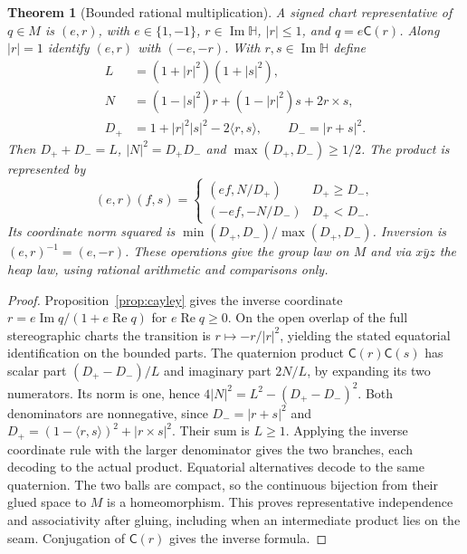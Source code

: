 \documentclass[11pt,reqno]{amsart}
\newtheorem{theorem}{Theorem}[section]
\theoremstyle{definition}
\theoremstyle{remark}
\numberwithin{equation}{section}
\newcommand{\HH}{\mathbb{H}}
\newcommand{\re}{\operatorname{Re}}
\newcommand{\im}{\operatorname{Im}}
\newcommand{\ip}[2]{\langle #1,#2\rangle}
\newcommand{\Cay}{\mathsf{C}}
\begin{document}
\begin{theorem}[Bounded rational multiplication]\label{m4:atlas}
A signed chart representative of $q\in M$ is $(e,r)$, with $e\in\{1,-1\}$, $r\in\im\HH$, $|r|\le1$, and $q=e\Cay(r)$. Along $|r|=1$ identify $(e,r)$ with $(-e,-r)$. With $r,s\in\im\HH$ define
\begin{align*}
 L&=(1+|r|^2)(1+|s|^2),\\
 N&=(1-|s|^2)r+(1-|r|^2)s+2r\times s,\\
 D_+&=1+|r|^2|s|^2-2\ip rs,\qquad D_-=|r+s|^2 .
\end{align*}
Then $D_++D_-=L$, $|N|^2=D_+D_-$ and $\max(D_+,D_-)\ge1/2$. The product is represented by
\[
 (e,r)(f,s)=
 \begin{cases}
 (ef,N/D_+) & D_+\ge D_-,\\
 (-ef,-N/D_-) & D_+<D_-.
 \end{cases}
\]
Its coordinate norm squared is $\min(D_+,D_-)/\max(D_+,D_-)$. Inversion is $(e,r)^{-1}=(e,-r)$. These operations give the group law on $M$ and via $x\bar yz$ the heap law, using rational arithmetic and comparisons only.
\end{theorem}
\begin{proof}
Proposition~\ref{prop:cayley} gives the inverse coordinate $r=e\im q/(1+e\re q)$ for $e\re q\ge0$. On the open overlap of the full stereographic charts the transition is $r\mapsto-r/|r|^2$, yielding the stated equatorial identification on the bounded parts. The quaternion product $\Cay(r)\Cay(s)$ has scalar part $(D_+-D_-)/L$ and imaginary part $2N/L$, by expanding its two numerators. Its norm is one, hence $4|N|^2=L^2-(D_+-D_-)^2$. Both denominators are nonnegative, since $D_- = |r+s|^2$ and $D_+=(1-\ip rs)^2+|r\times s|^2$. Their sum is $L\ge1$. Applying the inverse coordinate rule with the larger denominator gives the two branches, each decoding to the actual product. Equatorial alternatives decode to the same quaternion. The two balls are compact, so the continuous bijection from their glued space to $M$ is a homeomorphism. This proves representative independence and associativity after gluing, including when an intermediate product lies on the seam. Conjugation of $\Cay(r)$ gives the inverse formula.
\end{proof}
\end{document}
